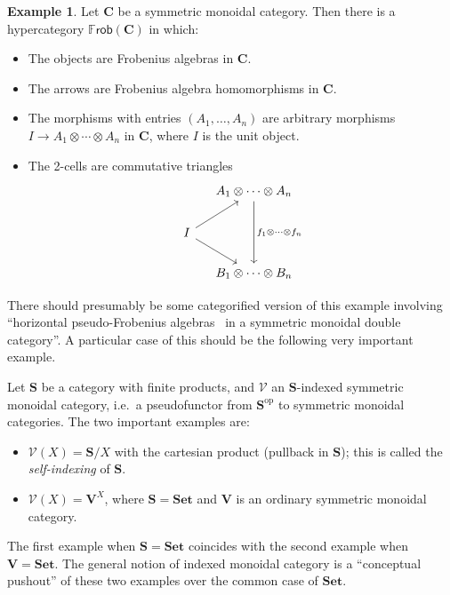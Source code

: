 \documentclass{article}
\theoremstyle{definition}
\newtheorem{eg}[thm]{Example}
\theoremstyle{remark}
\def\V{\mathscr{V}}
\def\frob{\mathbb{F}\mathsf{rob}}
\def\Set{\mathbf{Set}}
\def\op{^{\mathrm{op}}}
\def\bC{\ensuremath{\mathbf{C}}\xspace}
\def\bS{\ensuremath{\mathbf{S}}\xspace}
\begin{document}
\begin{eg}
  Let \bC be a symmetric monoidal category.
  Then there is a hypercategory $\frob(\bC)$ in which:
  \begin{itemize}
  \item The objects are Frobenius algebras in \bC.
  \item The arrows are Frobenius algebra homomorphisms in \bC.
  \item The morphisms with entries $(A_1,\dots,A_n)$ are arbitrary morphisms $I \to A_1\otimes\cdots\otimes A_n$ in \bC, where $I$ is the unit object.
  \item The 2-cells are commutative triangles
    \[
    \begin{tikzcd}[column sep=small]
      & A_1\otimes\cdots\otimes A_n \ar[dd,"f_1\otimes\cdots\otimes f_n"] \\
      I \ar[ur] \ar[dr] \\
      & B_1\otimes\cdots\otimes B_n
    \end{tikzcd}
    \]
  \end{itemize}
\end{eg}

There should presumably be some categorified version of this example involving ``horizontal pseudo-Frobenius algebras~\cite{lauda:psfrob} in a symmetric monoidal double category''.
A particular case of this should be the following very important example.

Let \bS be a category with finite products, and $\V$ an \bS-indexed symmetric monoidal category, i.e.\ a pseudofunctor from $\bS\op$ to symmetric monoidal categories.
The two important examples are:
\begin{itemize}
\item $\V(X) = \bS/X$ with the cartesian product (pullback in \bS); this is called the \emph{self-indexing} of $\bS$.
\item $\V(X) = \mathbf{V}^X$, where $\bS=\Set$ and $\mathbf{V}$ is an ordinary symmetric monoidal category.
\end{itemize}
The first example when $\bS=\Set$ coincides with the second example when $\mathbf{V}=\Set$.
The general notion of indexed monoidal category is a ``conceptual pushout'' of these two examples over the common case of $\Set$.
\end{document}
